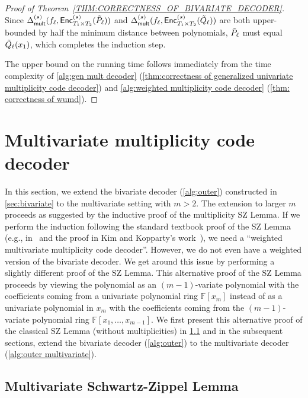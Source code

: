 \documentclass{theoretics}
\def\Field{\mathbb{F}}
\let\F\Field
\newcommand{\enc}{{\mathsf{Enc}}}
\newcommand{\Delm}{\Delta_{\mathsf{mult}}}
\begin{document}
\begin{proof}[Proof of Theorem~\ref{THM:CORRECTNESS_OF_BIVARIATE_DECODER}]
		Since $\Delm^{(s)}(f_{\ell},\enc^{(s)}_{T_1 \times T_2}(\Tilde{P}_{\ell}))$ and $\Delm^{(s)}(f_{\ell},\enc^{(s)}_{T_1 \times T_2}(\Tilde{Q}_{\ell}))$ are both upper-bounded by half the minimum distance between polynomials, $\Tilde{P}_{\ell}$ must equal $\Tilde{Q}_{\ell}(x_1)$, which completes the induction step.
		
		
		The upper bound on the running time follows immediately from the time complexity of \cref{alg:gen mult decoder} (\cref{thm:correctness of generalized univariate multiplicity code decoder}) and \cref{alg:weighted multiplicity code decoder} (\cref{thm: correctness of wumd}).		
	\end{proof}
	
	
	
	\section{Multivariate multiplicity code decoder}\label{sec: multivariate algorithm}
	
	In this section, we extend the bivariate decoder (\cref{alg:outer})
	constructed in \cref{sec:bivariate} to the multivariate setting with
	$m>2$. The extension to larger $m$ proceeds as suggested by the
	inductive proof of the multiplicity SZ Lemma. If we perform the
	induction following the standard textbook proof of the SZ Lemma (e.g., in~\cite{AroraBarak} and the proof in Kim and Kopparty's work~\cite{KimK2017}), we
	need a ``weighted multivariate multiplicity code decoder''. However,
	we do not even have a weighted version of the bivariate decoder. We get
	around this issue by performing a slightly different proof of the SZ
	Lemma. This alternative proof of the SZ Lemma
	proceeds by viewing the polynomial as an $(m-1)$-variate polynomial
	with the coefficients coming from a univariate polynomial ring
	$\F[x_m]$ instead of as a univariate polynomial in $x_m$ with the
	coefficients coming from the $(m-1)$-variate polynomial ring
	$\F[x_1, \ldots, x_{m-1}]$. We first present this alternative proof of the
	classical SZ Lemma (without multiplicities) in \cref{sec:msz} and in
	the subsequent sections, extend the bivariate decoder
	(\cref{alg:outer}) to the multivariate decoder (\cref{alg:outer
		multivariate}). 
	
	
	
	
	\subsection{Multivariate Schwartz-Zippel Lemma}\label{sec:msz}
	
\end{document}
